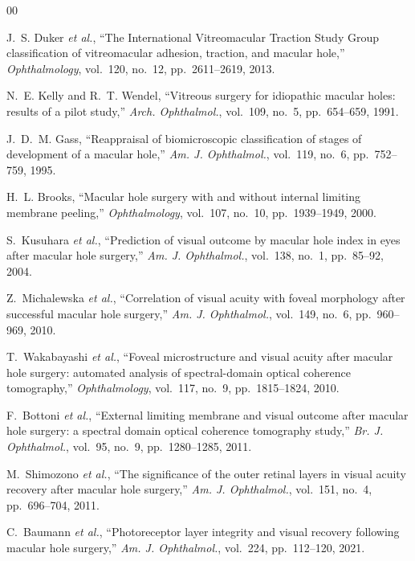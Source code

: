 \documentclass[preprint,12pt]{elsarticle}
\begin{document}
\begin{thebibliography}{00}

J.~S. Duker \textit{et al.}, ``The International Vitreomacular Traction Study Group classification of vitreomacular adhesion, traction, and macular hole,'' \textit{Ophthalmology}, vol.~120, no.~12, pp.~2611--2619, 2013.

N.~E. Kelly and R.~T. Wendel, ``Vitreous surgery for idiopathic macular holes: results of a pilot study,'' \textit{Arch. Ophthalmol.}, vol.~109, no.~5, pp.~654--659, 1991.

J.~D.~M. Gass, ``Reappraisal of biomicroscopic classification of stages of development of a macular hole,'' \textit{Am. J. Ophthalmol.}, vol.~119, no.~6, pp.~752--759, 1995.

H.~L. Brooks, ``Macular hole surgery with and without internal limiting membrane peeling,'' \textit{Ophthalmology}, vol.~107, no.~10, pp.~1939--1949, 2000.

S.~Kusuhara \textit{et al.}, ``Prediction of visual outcome by macular hole index in eyes after macular hole surgery,'' \textit{Am. J. Ophthalmol.}, vol.~138, no.~1, pp.~85--92, 2004.

Z.~Michalewska \textit{et al.}, ``Correlation of visual acuity with foveal morphology after successful macular hole surgery,'' \textit{Am. J. Ophthalmol.}, vol.~149, no.~6, pp.~960--969, 2010.

T.~Wakabayashi \textit{et al.}, ``Foveal microstructure and visual acuity after macular hole surgery: automated analysis of spectral-domain optical coherence tomography,'' \textit{Ophthalmology}, vol.~117, no.~9, pp.~1815--1824, 2010.

F.~Bottoni \textit{et al.}, ``External limiting membrane and visual outcome after macular hole surgery: a spectral domain optical coherence tomography study,'' \textit{Br. J. Ophthalmol.}, vol.~95, no.~9, pp.~1280--1285, 2011.

M.~Shimozono \textit{et al.}, ``The significance of the outer retinal layers in visual acuity recovery after macular hole surgery,'' \textit{Am. J. Ophthalmol.}, vol.~151, no.~4, pp.~696--704, 2011.

C.~Baumann \textit{et al.}, ``Photoreceptor layer integrity and visual recovery following macular hole surgery,'' \textit{Am. J. Ophthalmol.}, vol.~224, pp.~112--120, 2021.


\end{thebibliography}
\end{document}
